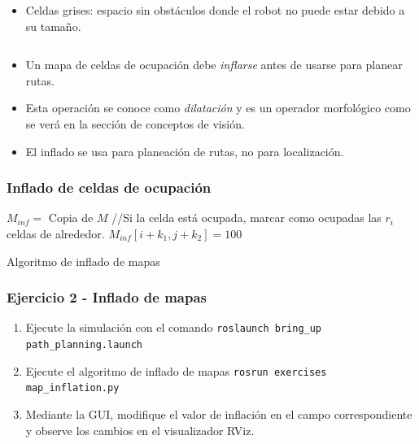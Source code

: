 \begin{frame}
\begin{columns}
\begin{column}{0.4\textwidth}
\begin{itemize}
        \item Celdas grises: espacio sin obstáculos donde el robot no puede estar debido a su tamaño. 
      \end{itemize}
    \end{column}
  \end{columns}
  \begin{itemize}
  \item Un mapa de celdas de ocupación debe \textit{inflarse} antes de usarse para planear rutas.
  \item Esta operación se conoce como \textit{dilatación} y es un operador morfológico como se verá en la sección de conceptos de visión.
  \item El inflado se usa para planeación de rutas, no para localización.
  \end{itemize}
\end{frame}

\begin{frame}\frametitle{Inflado de celdas de ocupación}
  \begin{algorithm}[H]
    \DontPrintSemicolon
    $M_{inf} = $ Copia de $M$\;
    \ForEach{$i\in [0,\dots,rows)$}
      {
        \ForEach{$j\in [0,\dots,cols)$}
          {
            //Si la celda está ocupada, marcar como ocupadas las $r_i$ celdas de alrededor.\;
               {
                   {
                       {
                         $M_{inf}[i+k_1, j+k_2] = 100$
                       }
                   }
               }    
          }
        }
        \caption{Algoritmo de inflado de mapas}
  \end{algorithm}
\end{frame}

\begin{frame}[containsverbatim]\frametitle{Ejercicio 2 - Inflado de mapas}
  \begin{enumerate}
  \item Ejecute la simulación con el comando \texttt{roslaunch bring\_up path\_planning.launch}
  \item Ejecute el algoritmo de inflado de mapas \texttt{rosrun exercises map\_inflation.py}
  \item Mediante la GUI, modifique el valor de inflación en el campo correspondiente y observe los cambios en el visualizador RViz.
  \end{enumerate}
\end{frame}

